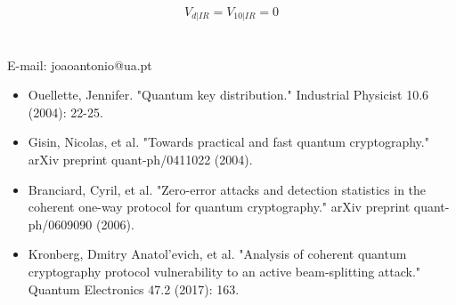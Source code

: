\documentclass[1000pt]{article}
\newcommand{\mysection}[1]{\section*{\color{black}\sffamily #1}}%
\begin{document}
$$V_{d|IR} = V_{10|IR} =0$$



\mysection{} \sffamily \Large
\vspace{-10mm}
\centerline{E-mail: joaoantonio@ua.pt}
\vspace*{7cm}
\begin{itemize}
	\item Ouellette, Jennifer. "Quantum key distribution." Industrial Physicist 10.6 (2004): 22-25.
	\item Gisin, Nicolas, et al. "Towards practical and fast quantum cryptography." arXiv preprint quant-ph/0411022 (2004).
	\item Branciard, Cyril, et al. "Zero-error attacks and detection statistics in the coherent one-way protocol for quantum cryptography." arXiv preprint quant-ph/0609090 (2006).
	\item Kronberg, Dmitry Anatol'evich, et al. "Analysis of coherent quantum cryptography protocol vulnerability to an active beam-splitting attack." Quantum Electronics 47.2 (2017): 163.
\end{itemize}
\end{document}
